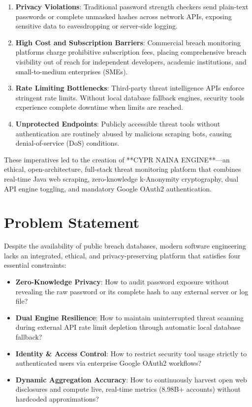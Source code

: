 \documentclass[12pt,a4paper,oneside]{report}
\begin{document}
\begin{enumerate}
    \item \textbf{Privacy Violations}: Traditional password strength checkers send plain-text passwords or complete unmasked hashes across network APIs, exposing sensitive data to eavesdropping or server-side logging.
    \item \textbf{High Cost and Subscription Barriers}: Commercial breach monitoring platforms charge prohibitive subscription fees, placing comprehensive breach visibility out of reach for independent developers, academic institutions, and small-to-medium enterprises (SMEs).
    \item \textbf{Rate Limiting Bottlenecks}: Third-party threat intelligence APIs enforce stringent rate limits. Without local database fallback engines, security tools experience complete downtime when limits are reached.
    \item \textbf{Unprotected Endpoints}: Publicly accessible threat tools without authentication are routinely abused by malicious scraping bots, causing denial-of-service (DoS) conditions.
\end{enumerate}

These imperatives led to the creation of **CYPR NAINA ENGINE**—an ethical, open-architecture, full-stack threat monitoring platform that combines real-time Java web scraping, zero-knowledge k-Anonymity cryptography, dual API engine toggling, and mandatory Google OAuth2 authentication.

\section{Problem Statement}

Despite the availability of public breach databases, modern software engineering lacks an integrated, ethical, and privacy-preserving platform that satisfies four essential constraints:

\begin{itemize}
    \item \textbf{Zero-Knowledge Privacy}: How to audit password exposure without revealing the raw password or its complete hash to any external server or log file?
    \item \textbf{Dual Engine Resilience}: How to maintain uninterrupted threat scanning during external API rate limit depletion through automatic local database fallback?
    \item \textbf{Identity & Access Control}: How to restrict security tool usage strictly to authenticated users via enterprise Google OAuth2 workflows?
    \item \textbf{Dynamic Aggregation Accuracy}: How to continuously harvest open web disclosures and compute live, real-time metrics (8.98B+ accounts) without hardcoded approximations?
\end{itemize}
\end{document}
